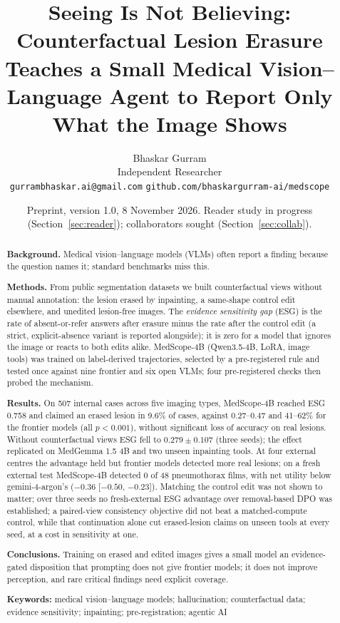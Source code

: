 \documentclass[11pt]{article}
\title{\textbf{Seeing Is Not Believing: Counterfactual Lesion Erasure Teaches a Small Medical Vision--Language Agent to Report Only What the Image Shows}}
\author{Bhaskar Gurram\\ \small Independent Researcher\\ \small \texttt{gurrambhaskar.ai@gmail.com} \quad \texttt{github.com/bhaskargurram-ai/medscope}}
\date{\small Preprint, version 1.0, 8 November 2026. Reader study in progress (Section~\ref{sec:reader}); collaborators sought (Section~\ref{sec:collab}).}
\begin{document}
\maketitle



\begin{abstract}
\noindent\textbf{Background.} Medical vision--language models (VLMs) often report a finding because the question names it; standard benchmarks miss this.

\noindent\textbf{Methods.} From public segmentation datasets we built counterfactual views without manual annotation: the lesion erased by inpainting, a same-shape control edit elsewhere, and unedited lesion-free images. The \emph{evidence sensitivity gap} (ESG) is the rate of absent-or-refer answers after erasure minus the rate after the control edit (a strict, explicit-absence variant is reported alongside); it is zero for a model that ignores the image or reacts to both edits alike. MedScope-4B (Qwen3.5-4B, LoRA, image tools) was trained on label-derived trajectories, selected by a pre-registered rule and tested once against nine frontier and six open VLMs; four pre-registered checks then probed the mechanism.

\noindent\textbf{Results.} On 507 internal cases across five imaging types, MedScope-4B reached ESG 0.758 and claimed an erased lesion in 9.6\% of cases, against 0.27--0.47 and 41--62\% for the frontier models (all $p<0.001$), without significant loss of accuracy on real lesions. Without counterfactual views ESG fell to $0.279\pm0.107$ (three seeds); the effect replicated on MedGemma 1.5 4B and two unseen inpainting tools. At four external centres the advantage held but frontier models detected more real lesions; on a fresh external test MedScope-4B detected 0 of 48 pneumothorax films, with net utility below gemini-4-argon's ($-0.36$ [$-0.50$, $-0.23$]). Matching the control edit was not shown to matter; over three seeds no fresh-external ESG advantage over removal-based DPO was established; a paired-view consistency objective did not beat a matched-compute control, while that continuation alone cut erased-lesion claims on unseen tools at every seed, at a cost in sensitivity at one.

\noindent\textbf{Conclusions.} Training on erased and edited images gives a small model an evidence-gated disposition that prompting does not give frontier models; it does not improve perception, and rare critical findings need explicit coverage.

\medskip\noindent\textbf{Keywords:} medical vision--language models; hallucination; counterfactual data; evidence sensitivity; inpainting; pre-registration; agentic AI
\end{abstract}
\end{document}
